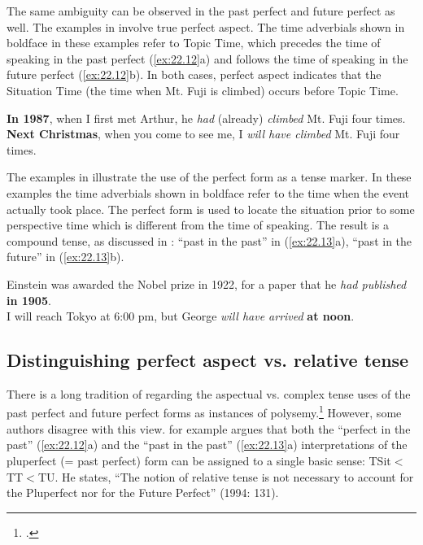 The same ambiguity can be observed in the past perfect and future perfect as well. The examples in  involve true perfect aspect. The time adverbials shown in boldface in these examples refer to Topic Time, which precedes the time of speaking in the past perfect (\ref{ex:22.12}a) and follows the time of speaking in the future perfect (\ref{ex:22.12}b). In both cases, perfect aspect indicates that the Situation Time (the time when Mt. Fuji is climbed) occurs before Topic Time.


\ea \label{ex:22.12}
\ea \textbf{In 1987}, when I first met Arthur, he \textit{had} (already) \textit{climbed} Mt. Fuji four times.\\
\ex \textbf{Next Christmas}, when you come to see me, I \textit{will have climbed} Mt. Fuji four times.
                       \z
\z


The examples in  illustrate the use of the perfect form as a tense marker. In these examples the time adverbials shown in boldface refer to the time when the event actually took place. The perfect form is used to locate the situation prior to some perspective time which is different from the time of speaking. The result is a compound tense, as discussed in : “past in the past” in (\ref{ex:22.13}a), “past in the future” in (\ref{ex:22.13}b).


\ea \label{ex:22.13}
\ea Einstein was awarded the Nobel prize in 1922, for a paper that he \textit{had published} \textbf{in 1905}.\\
\ex I will reach Tokyo at 6:00 pm, but George \textit{will have arrived} \textbf{at noon}.
                       \z
\z

\subsection{Distinguishing perfect aspect vs. relative tense}\label{sec:22.3.2}

There is a long tradition of regarding the aspectual vs. complex tense uses of the past perfect and future perfect forms as instances of polysemy.\footnote{\citet{Jespersen1924,Comrie1976}.} However, some authors disagree with this view. \citet{Klein1994} for example argues that both the “perfect in the past” (\ref{ex:22.12}a) and the “past in the past” (\ref{ex:22.13}a) interpretations of the pluperfect (= past perfect) form can be assigned to a single basic sense: TSit${<}$TT${<}$TU. He states, “The notion of relative tense is not necessary to account for the Pluperfect nor for the Future Perfect” (1994: 131).



